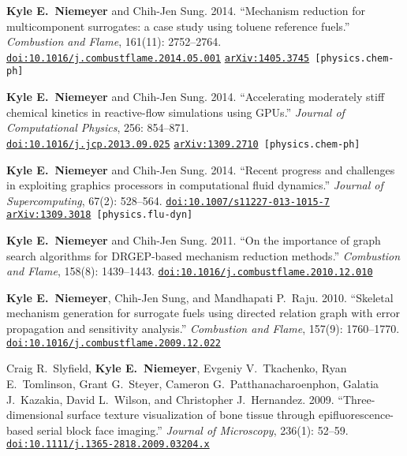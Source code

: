 \documentclass[margin,line,11pt]{res}
\makeatletter
\newlength{\bibhang}
\newlength{\bibsep}
 {\@listi \global\bibsep\itemsep \global\advance\bibsep by\parsep}
\newenvironment{bibenum*}
  {\renewcommand\labelenumi{\theenumi.}%
   \etaremune[
     topsep=0pt,
     itemsep=\bibsep,
     parsep=0pt,partopsep=0pt,
     itemindent=-\bibhang,
     leftmargin={\bibhang+\widthof{[999]}}]}
  {\endetaremune}
\newcommand*{\doi}[1]{\href{http://dx.doi.org/#1}{\nolinkurl{doi:#1}}}
\makeatother
\begin{document}
\begin{resume}
\begin{bibenum*}
\item \textbf{Kyle E.\ Niemeyer} and Chih-Jen Sung.
2014.
``Mechanism reduction for multicomponent surrogates: a case study using toluene reference fuels.''
\emph{Combustion and Flame}, 161(11): 2752--2764.
\doi{10.1016/j.combustflame.2014.05.001} 
{\tt \href{http://arxiv.org/abs/1405.3745}{arXiv:1405.3745} [physics.chem-ph]}

\item \textbf{Kyle E.\ Niemeyer} and Chih-Jen Sung.
2014.
``Accelerating moderately stiff chemical kinetics in reactive-flow simulations using GPUs.''
\emph{Journal of Computational Physics}, 256: 854--871. \\ 
\doi{10.1016/j.jcp.2013.09.025} 
{\tt \href{http://arxiv.org/abs/1309.2710}{arXiv:1309.2710} [physics.chem-ph]}

\item \textbf{Kyle E.\ Niemeyer} and Chih-Jen Sung.
2014.
``Recent progress and challenges in exploiting graphics processors in computational fluid dynamics.''
\emph{Journal of Supercomputing}, 67(2): 528--564.
\doi{10.1007/s11227-013-1015-7} \\
{\tt \href{http://arxiv.org/abs/1309.3018}{arXiv:1309.3018} [physics.flu-dyn]}

\item \textbf{Kyle E.\ Niemeyer} and Chih-Jen Sung.
2011.
``On the importance of graph search algorithms for DRGEP-based mechanism reduction methods.''
\emph{Combustion and Flame}, 158(8): 1439--1443.
\doi{10.1016/j.combustflame.2010.12.010}

\item \textbf{Kyle E.\ Niemeyer}, Chih-Jen Sung, and Mandhapati P.\ Raju.
2010.
``Skeletal mechanism generation for surrogate fuels using directed relation graph with error propagation and sensitivity analysis.''
\emph{Combustion and Flame}, 157(9): 1760--1770. \\
\doi{10.1016/j.combustflame.2009.12.022}

\item Craig R.\ Slyfield, \textbf{Kyle E.\ Niemeyer}, Evgeniy V.\ Tkachenko, Ryan E.\ Tomlinson, Grant G.\ Steyer, Cameron G.\ \mbox{Patthanacharoenphon}, Galatia J.\ Kazakia, David L.\ Wilson, and Christopher J.\ Hernandez.
2009.
``Three-dimensional surface texture visualization of bone tissue through epifluorescence-based serial block face imaging.''
\emph{Journal of Microscopy}, 236(1): 52--59.
\doi{10.1111/j.1365-2818.2009.03204.x}

\end{bibenum*}


\end{resume}
\end{document}
